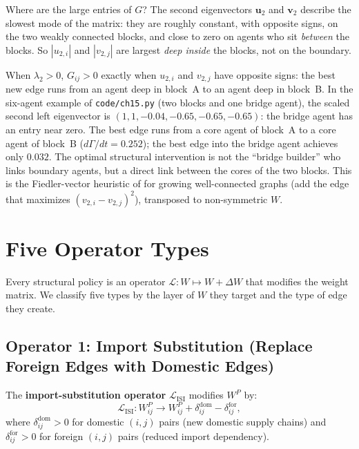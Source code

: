\documentclass[../structural_economics_book.tex]{subfiles}
\begin{document}
\begin{intuition}
Where are the large entries of $G$? The second eigenvectors $\mathbf{u}_2$ and $\mathbf{v}_2$ describe the slowest mode of the matrix: they are roughly constant, with opposite signs, on the two weakly connected blocks, and close to zero on agents who sit \emph{between} the blocks. So $|u_{2,i}|$ and $|v_{2,j}|$ are largest \emph{deep inside} the blocks, not on the boundary.

When $\lambda_2 > 0$, $G_{ij} > 0$ exactly when $u_{2,i}$ and $v_{2,j}$ have opposite signs: the best new edge runs from an agent deep in block~A to an agent deep in block~B. In the six-agent example of \texttt{code/ch15.py} (two blocks and one bridge agent), the scaled second left eigenvector is $(1, 1, -0.04, -0.65, -0.65, -0.65)$: the bridge agent has an entry near zero. The best edge runs from a core agent of block~A to a core agent of block~B ($d\Gamma/dt = 0.252$); the best edge into the bridge agent achieves only $0.032$. The optimal structural intervention is not the ``bridge builder'' who links boundary agents, but a direct link between the cores of the two blocks. This is the Fiedler-vector heuristic of \citet{ghosh2006growing} for growing well-connected graphs (add the edge that maximizes $(v_{2,i} - v_{2,j})^2$), transposed to non-symmetric $W$.
\end{intuition}


\section{Five Operator Types}
\label{ch15:sec:operators}

Every structural policy is an operator $\mathcal{L}: W \mapsto W + \Delta W$ that modifies the weight matrix. We classify five types by the layer of $W$ they target and the type of edge they create.


\subsection{Operator 1: Import Substitution (Replace Foreign Edges with Domestic Edges)}

\begin{definition}\label{ch15:def:isi}
The \textbf{import-substitution operator} $\mathcal{L}_{\text{ISI}}$ modifies $W^P$ by:
\begin{equation}\label{ch15:eq:isi}
\mathcal{L}_{\text{ISI}}: W^P_{ij} \to W^P_{ij} + \delta_{ij}^{\text{dom}} - \delta_{ij}^{\text{for}},
\end{equation}
where $\delta_{ij}^{\text{dom}} > 0$ for domestic $(i,j)$ pairs (new domestic supply chains) and $\delta_{ij}^{\text{for}} > 0$ for foreign $(i,j)$ pairs (reduced import dependency).
\end{definition}
\end{document}
